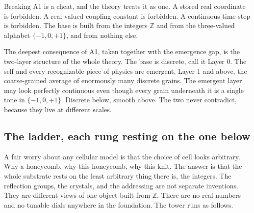 Breaking A1 is a cheat, and the theory treats it as one. A stored real coordinate is forbidden. A real-valued coupling constant is forbidden. A continuous time step is forbidden. The base is built from the integers $\mathbb{Z}$ and from the three-valued alphabet $\{-1, 0, +1\}$, and from nothing else.

The deepest consequence of A1, taken together with the emergence gap, is the two-layer structure of the whole theory. The base is discrete, call it Layer 0. The self and every recognizable piece of physics are emergent, Layer 1 and above, the coarse-grained average of enormously many discrete grains. The emergent layer may look perfectly continuous even though every grain underneath it is a single tone in $\{-1, 0, +1\}$. Discrete below, smooth above. The two never contradict, because they live at different scales.

\subsection{The ladder, each rung resting on the one below}

A fair worry about any cellular model is that the choice of cell looks arbitrary. Why a honeycomb, why this honeycomb, why this knit. The answer is that the whole substrate rests on the least arbitrary thing there is, the integers. The reflection groups, the crystals, and the addressing are not separate inventions. They are different views of one object built from $\mathbb{Z}$. There are no real numbers and no tunable dials anywhere in the foundation. The tower runs as follows.

